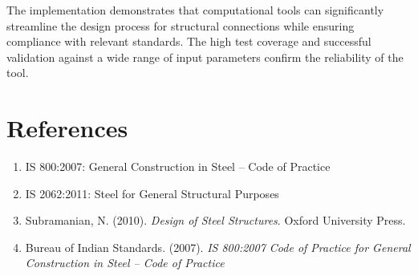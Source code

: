 \documentclass[12pt,a4paper]{article}
\begin{document}
The implementation demonstrates that computational tools can significantly streamline the design process for structural connections while ensuring compliance with relevant standards. The high test coverage and successful validation against a wide range of input parameters confirm the reliability of the tool.

\section{References}
\begin{enumerate}
    \item IS 800:2007: General Construction in Steel – Code of Practice
    \item IS 2062:2011: Steel for General Structural Purposes
    \item Subramanian, N. (2010). \textit{Design of Steel Structures}. Oxford University Press.
    \item Bureau of Indian Standards. (2007). \textit{IS 800:2007 Code of Practice for General Construction in Steel – Code of Practice}
\end{enumerate}
\end{document}
